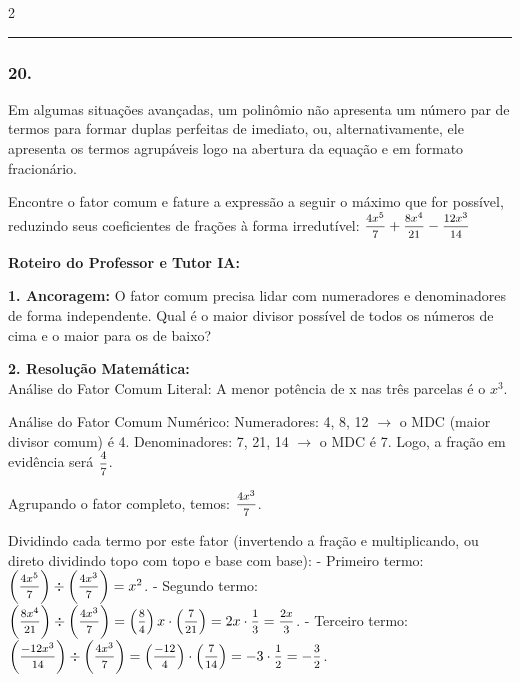 \begin{multicols*}{2}
\par\vspace{\espacoQuestao}

\noindent\textcolor{CorLinha}{\rule{\linewidth}{0.5pt}} 
\par\vspace{\espacoPreQuestao}
\subsubsection*{20.} 
\begin{enunciadoLiteral}
Em algumas situações avançadas, um polinômio não apresenta um número par de termos para formar duplas perfeitas de imediato, ou, alternativamente, ele apresenta os termos agrupáveis logo na abertura da equação e em formato fracionário.

Encontre o fator comum e fature a expressão a seguir o máximo que for possível, reduzindo seus coeficientes de frações à forma irredutível:
$ \mfrac{4x^5}{7} + \mfrac{8x^4}{21} - \mfrac{12x^3}{14} $
\end{enunciadoLiteral}

\ifgabarito
    \begin{tcolorbox}[colback=CorTitUm!5, colframe=CorTitUm, boxrule=1pt, arc=4pt, left=6pt, right=6pt, top=6pt, bottom=6pt]
    \small\textbf{\textcolor{CorTitUm}{Roteiro do Professor e Tutor IA:}}\par\vspace{0.1cm}
    \color{CinzaEscuro}
    \textbf{1. Ancoragem:} O fator comum precisa lidar com numeradores e denominadores de forma independente. Qual é o maior divisor possível de todos os números de cima e o maior para os de baixo?\par\vspace{0.1cm}
    \textbf{2. Resolução Matemática:}\\
    Análise do Fator Comum Literal:
    A menor potência de x nas três parcelas é o $ x^3 $.
    
    Análise do Fator Comum Numérico:
    Numeradores: 4, 8, 12 $\rightarrow$ o MDC (maior divisor comum) é 4.
    Denominadores: 7, 21, 14 $\rightarrow$ o MDC é 7.
    Logo, a fração em evidência será $ \mfrac{4}{7} $.
    
    Agrupando o fator completo, temos: $ \mfrac{4x^3}{7} $.
    
    Dividindo cada termo por este fator (invertendo a fração e multiplicando, ou direto dividindo topo com topo e base com base):
    - Primeiro termo: $ \left( \mfrac{4x^5}{7} \right) \div \left( \mfrac{4x^3}{7} \right) = x^2 $.
    - Segundo termo: $ \left( \mfrac{8x^4}{21} \right) \div \left( \mfrac{4x^3}{7} \right) = \left( \mfrac{8}{4} \right)x \cdot \left( \mfrac{7}{21} \right) = 2x \cdot \mfrac{1}{3} = \mfrac{2x}{3} $.
    - Terceiro termo: $ \left( \mfrac{-12x^3}{14} \right) \div \left( \mfrac{4x^3}{7} \right) = \left( \mfrac{-12}{4} \right) \cdot \left( \mfrac{7}{14} \right) = -3 \cdot \mfrac{1}{2} = -\mfrac{3}{2} $.
    

\end{tcolorbox}
\end{multicols*}
